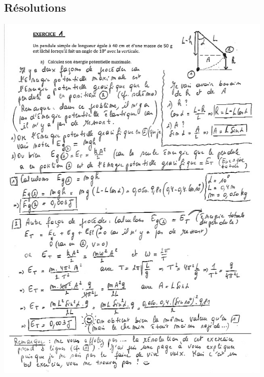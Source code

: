 \subsection{Résolutions }

 \includegraphics[width=15cm]{COURS2EnergieOHEXERCRESOL-img/COURS2EnergieOHEXERCRESOL-img007.png} 

